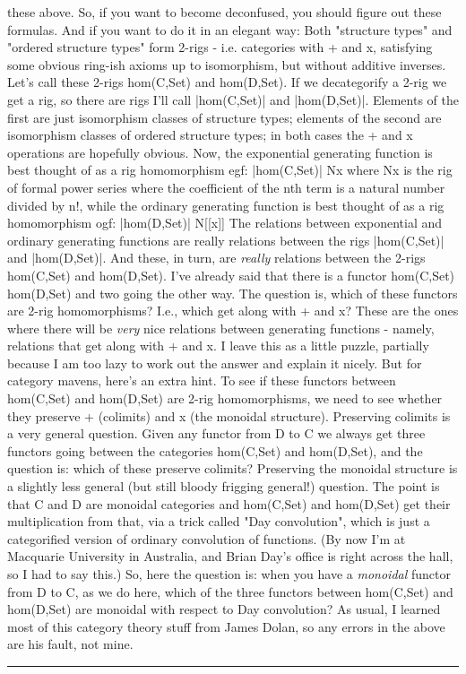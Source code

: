 these above.  So, if you want to become deconfused, you 
should figure out these formulas.
And if you want to do it in an elegant way: 
Both "structure types" and "ordered structure types" 
form 2-rigs - 
i.e. categories with + and x, satisfying some obvious ring-ish 
axioms up to isomorphism, but without additive inverses.
Let's call these 2-rigs hom(C,Set) and hom(D,Set).  
If we decategorify a 2-rig we get a rig, so there are rigs I'll call 
|hom(C,Set)| and |hom(D,Set)|.  Elements of the first are just isomorphism
classes of structure types; elements of the second are isomorphism
classes of ordered structure types; in both cases the + and x 
operations are hopefully obvious.
Now, the exponential generating function is best thought of as
a rig homomorphism
egf: |hom(C,Set)| \to  N{{x}}
where N{{x}} is the rig of formal power series where the
coefficient of the nth term is a natural number divided by n!,
while the ordinary generating function is best thought of as
a rig homomorphism
ogf: |hom(D,Set)| \to  N[[x]]
The relations between exponential and ordinary generating 
functions are really relations between the rigs |hom(C,Set)| 
and |hom(D,Set)|.  And these, in turn, are \emph{really} relations 
between the 2-rigs hom(C,Set) and hom(D,Set).  
I've already said that there is a functor 
hom(C,Set) \to  hom(D,Set)
and two going the other way.  The question is, which of these
functors are 2-rig homomorphisms?  I.e., which get along with
+ and x?  These are the ones where there will be \emph{very} nice
relations between generating functions - namely, relations 
that get along with + and x.
I leave this as a little puzzle, partially because I am
too lazy to work out the answer and explain it nicely.
But for category mavens, here's an extra hint.  To see if
these functors between hom(C,Set) and hom(D,Set) are 2-rig
homomorphisms, we need to see whether they preserve + (colimits)
and x (the monoidal structure).  
Preserving colimits is a very general question.
Given any functor from D to C we always 
get three functors going between the categories 
hom(C,Set) and hom(D,Set), and the question is: which of 
these preserve colimits?
Preserving the monoidal structure is a slightly less general 
(but still bloody frigging general!) question.  The point is that
C and D are monoidal categories and hom(C,Set) and hom(D,Set)
get their multiplication from that, via a trick called "Day
convolution", which is just a categorified version of ordinary 
convolution of functions.  (By now I'm at Macquarie University
in Australia, and Brian Day's office is right across the hall,
so I had to say this.)  
So, here the question is: when you have a \emph{monoidal} functor from 
D to C, as we do here, which of the three functors between hom(C,Set) 
and hom(D,Set) are monoidal with respect to Day convolution?
As usual, I learned most of this category theory stuff from 
James Dolan, so any errors in the above are his fault, not mine.  

\par\noindent\rule{\textwidth}{0.4pt}
